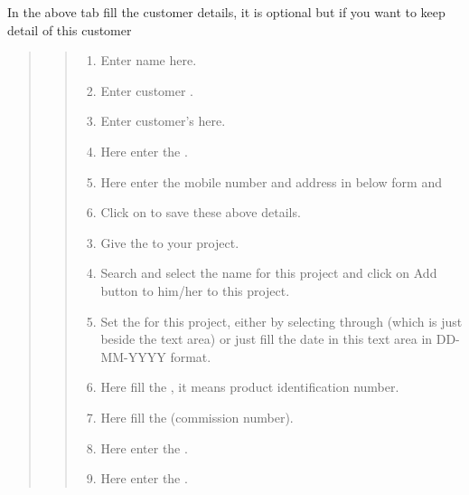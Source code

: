 \documentclass[letterpaper,10pt,english]{sphinxmanual}
\begin{document}
In the above tab fill the customer details, it is optional but if you want to keep detail of this customer
\begin{quote}
\begin{quote}
\begin{enumerate}
\item {} 
Enter  name here.

\item {} 
Enter customer  .

\item {} 
Enter customer’s  here.

\item {} 
Here enter the  .

\item {} 
Here enter the mobile number and address in below form and

\item {} 
Click on  to save these above details.

\end{enumerate}
\begin{enumerate}
\setcounter{enumi}{2}
\item {} 
Give the  to your project.

\item {} 
Search and select the  name for this project and click on Add button to  him/her to this project.

\item {} 
Set the  for this project, either by selecting through  (which is just beside the text area) or just fill the date in this text area in DD-MM-YYYY format.

\item {} 
Here fill the  , it means product identification number.

\item {} 
Here fill the  (commission number).

\item {} 
Here enter the  .

\item {} 
Here enter the  .


\end{enumerate}
\end{quote}
\end{quote}
\end{document}
